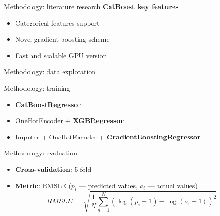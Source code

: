 \begin{frame}{Methodology: literature research}
	\textbf{CatBoost key features}
	\begin{itemize}
		\item Categorical features support
		\item Novel gradient-boosting scheme
		\item Fast and scalable GPU version
	\end{itemize}
\end{frame}

\begin{frame}{Methodology: data exploration}
	\begin{table}
		\centering
	\end{table}
\end{frame}

\begin{frame}{Methodology: training}
	\begin{itemize}
		\item \textbf{CatBoostRegressor}
		\item OneHotEncoder + \textbf{XGBRegressor}
		\item Imputer + OneHotEncoder + \textbf{GradientBoostingRegressor}
	\end{itemize}
	
\end{frame}

\begin{frame}{Methodology: evaluation}
	\begin{itemize}
		\item \textbf{Cross-validation}: 5-fold
		\item \textbf{Metric}: RMSLE ($p_i$ --- predicted values, $a_i$ --- actual values)
		$$ RMSLE = \sqrt[]{\frac{1}{N}\sum_{n = 1}^N (\log(p_i + 1) - \log(a_i + 1))^2} $$
	\end{itemize}
\end{frame}
